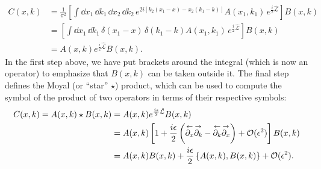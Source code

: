 %
\begin{equation}
  \begin{aligned}
    C(x, k) &= \frac{1}{\pi^{2}} \left[\int \dd{x_{1}}\, \dd{k_{1}}\, \dd{x_{2}}\, \dd{k_{2}}\,e^{2i[k_{2}(x_{1} - x) - x_{2}(k_{1} - k)]} A(x_{1}, k_{1})\, e^{\frac{i}{2}\hat{\mathcal{L}}}\right] B(x, k)\\
                     &= \left[\int \dd{x_{1}}\, \dd{k_{1}}\, \delta(x_{1} - x)\,\delta(k_{1} - k) A(x_{1}, k_{1})\, e^{\frac{i}{2}\hat{\mathcal{L}}}\right] B(x, k)\\
                     &= A(x, k)e^{\frac{i}{2}\hat{\mathcal{L}}} B(x, k).
  \end{aligned}
\end{equation}
%
In the first step above, we have put brackets around the integral (which is now an operator) to emphasize that $B(x, k)$ can be taken outside it.
The final step defines the Moyal (or ``star'' $\star$) product, which can be used to compute the symbol of the product of two operators in terms of their respective symbols:
%
\begin{equation}
  \begin{aligned}
    C(x, k) = A(x, k)\star B(x, k) &= A(x, k)e^{\frac{i\epsilon}{2}\hat{\mathcal{L}}} B(x, k)\\
                                                             &= A(x, k)\left[1 + \frac{i\epsilon}{2}\left(\overset{\gets}{\partial_{x}}\overset{\to}{\partial_{k}} - \overset{\gets}{\partial_{k}}\overset{\to}{\partial_{x}}\right) + \mathcal{O}(\epsilon^{2}) \right] B(x, k)\\
                                                             &= A(x, k)B(x, k) + \frac{i\epsilon}{2}\left\{A(x, k), B(x, k)\right\} + \mathcal{O}(\epsilon^{2}).
  \end{aligned}
\end{equation}
